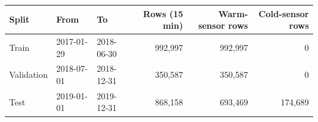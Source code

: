 \begin{tabular}{lllrrr}
\toprule
Split & From & To & Rows (15 min) & Warm-sensor rows & Cold-sensor rows \\
\midrule
Train & 2017-01-29 & 2018-06-30 & 992,997 & 992,997 & 0 \\
Validation & 2018-07-01 & 2018-12-31 & 350,587 & 350,587 & 0 \\
Test & 2019-01-01 & 2019-12-31 & 868,158 & 693,469 & 174,689 \\
\bottomrule
\end{tabular}
